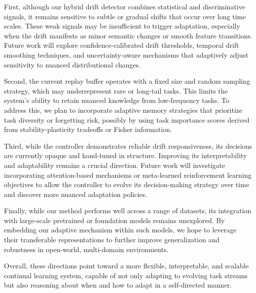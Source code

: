 \documentclass[conference]{IEEEtran}
\begin{document}
First, although our hybrid drift detector combines statistical and discriminative signals, it remains sensitive to subtle or gradual shifts that occur over long time scales. These weak signals may be insufficient to trigger adaptation, especially when the drift manifests as minor semantic changes or smooth feature transitions. Future work will explore confidence-calibrated drift thresholds, temporal drift smoothing techniques, and uncertainty-aware mechanisms that adaptively adjust sensitivity to nuanced distributional changes.

Second, the current replay buffer operates with a fixed size and random sampling strategy, which may underrepresent rare or long-tail tasks. This limits the system’s ability to retain nuanced knowledge from low-frequency tasks. To address this, we plan to incorporate adaptive memory strategies that prioritize task diversity or forgetting risk, possibly by using task importance scores derived from stability-plasticity tradeoffs or Fisher information.

Third, while the controller demonstrates reliable drift responsiveness, its decisions are currently opaque and hand-tuned in structure. Improving its interpretability and adaptability remains a crucial direction. Future work will investigate incorporating attention-based mechanisms or meta-learned reinforcement learning objectives to allow the controller to evolve its decision-making strategy over time and discover more nuanced adaptation policies.

Finally, while our method performs well across a range of datasets, its integration with large-scale pretrained or foundation models remains unexplored. By embedding our adaptive mechanism within such models, we hope to leverage their transferable representations to further improve generalization and robustness in open-world, multi-domain environments.

Overall, these directions point toward a more flexible, interpretable, and scalable continual learning system, capable of not only adapting to evolving task streams but also reasoning about when and how to adapt in a self-directed manner.

 

\end{document}
